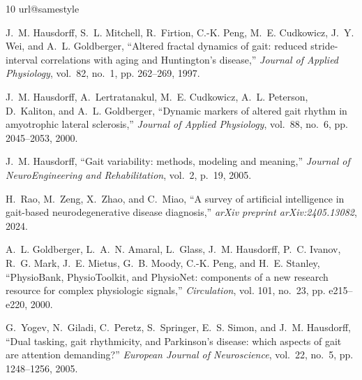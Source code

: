 \documentclass[conference]{IEEEtran}
\begin{document}
\balance
\begin{thebibliography}{10}
\providecommand{\url}[1]{#1}
\csname url@samestyle\endcsname
\providecommand{\newblock}{\relax}
\providecommand{\bibinfo}[2]{#2}
\providecommand{\BIBentrySTDinterwordspacing}{\spaceskip=0pt\relax}
\providecommand{\BIBentryALTinterwordstretchfactor}{4}
\providecommand{\BIBentryALTinterwordspacing}{\spaceskip=\fontdimen2\font plus
\BIBentryALTinterwordstretchfactor\fontdimen3\font minus
  \fontdimen4\font\relax}
\providecommand{\BIBforeignlanguage}[2]{{%
\expandafter\ifx\csname l@#1\endcsname\relax
\typeout{** WARNING: IEEEtran.bst: No hyphenation pattern has been}%
\typeout{** loaded for the language `#1'. Using the pattern for}%
\typeout{** the default language instead.}%
\else
\language=\csname l@#1\endcsname
\fi
#2}}
\providecommand{\BIBdecl}{\relax}
\BIBdecl

J.~M. Hausdorff, S.~L. Mitchell, R.~Firtion, C.-K. Peng, M.~E. Cudkowicz, J.~Y.
  Wei, and A.~L. Goldberger, ``Altered fractal dynamics of gait: reduced
  stride-interval correlations with aging and {Huntington's} disease,''
  \emph{Journal of Applied Physiology}, vol.~82, no.~1, pp. 262--269, 1997.

J.~M. Hausdorff, A.~Lertratanakul, M.~E. Cudkowicz, A.~L. Peterson, D.~Kaliton,
  and A.~L. Goldberger, ``Dynamic markers of altered gait rhythm in amyotrophic
  lateral sclerosis,'' \emph{Journal of Applied Physiology}, vol.~88, no.~6,
  pp. 2045--2053, 2000.

J.~M. Hausdorff, ``Gait variability: methods, modeling and meaning,''
  \emph{Journal of NeuroEngineering and Rehabilitation}, vol.~2, p.~19, 2005.

H.~Rao, M.~Zeng, X.~Zhao, and C.~Miao, ``A survey of artificial intelligence in
  gait-based neurodegenerative disease diagnosis,'' \emph{arXiv preprint
  arXiv:2405.13082}, 2024.

A.~L. Goldberger, L.~A.~N. Amaral, L.~Glass, J.~M. Hausdorff, P.~C. Ivanov,
  R.~G. Mark, J.~E. Mietus, G.~B. Moody, C.-K. Peng, and H.~E. Stanley,
  ``{PhysioBank}, {PhysioToolkit}, and {PhysioNet}: components of a new
  research resource for complex physiologic signals,'' \emph{Circulation}, vol.
  101, no.~23, pp. e215--e220, 2000.

G.~Yogev, N.~Giladi, C.~Peretz, S.~Springer, E.~S. Simon, and J.~M. Hausdorff,
  ``Dual tasking, gait rhythmicity, and {Parkinson's} disease: which aspects of
  gait are attention demanding?'' \emph{European Journal of Neuroscience},
  vol.~22, no.~5, pp. 1248--1256, 2005.


\end{thebibliography}
\end{document}
